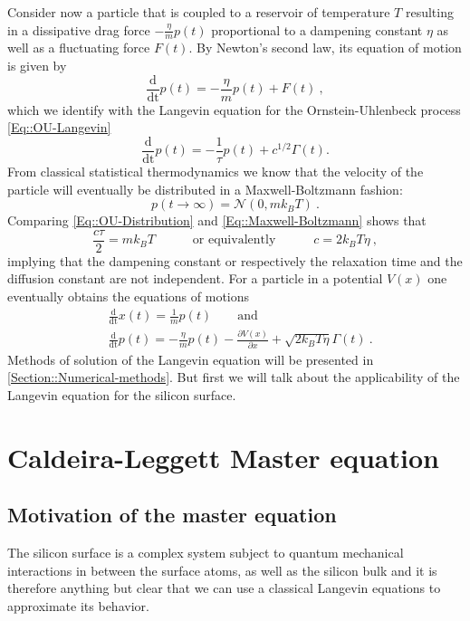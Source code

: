 	Consider now a particle that is coupled to a reservoir of temperature $T$ resulting in a dissipative drag force $- \frac{\eta}{m} p(t)$ proportional to a dampening constant $\eta$ as well as a fluctuating force $F(t)$. By Newton's second law, its equation of motion is given by
	\begin{equation}
		\frac{\text{d}}{\text{dt}} p(t) =	- \frac{\eta}{m} p(t) + F(t)~,
	\end{equation}
	which we identify with the Langevin equation for the Ornstein-Uhlenbeck process \autoref{Eq::OU-Langevin}
	\begin{equation}
		\frac{\text{d}}{\text{dt}} p(t) =	- \frac{1}{\tau} p(t) + { c^{1/2}}{} \Gamma(t).
	\end{equation}
	From classical statistical thermodynamics we know that the velocity of the particle will eventually be distributed in a Maxwell-Boltzmann fashion:
	\begin{equation} \label{Eq::Maxwell-Boltzmann}
		p(t\rightarrow \infty) =	\mathcal{N}(0, m k_B T)~.
	\end{equation}
	Comparing \autoref{Eq::OU-Distribution} and \autoref{Eq::Maxwell-Boltzmann} shows that
	\begin{equation}
		\frac{c \tau}{2} =	m k_B T \qquad \quad \text{or equivalently} \qquad \quad c =	{2 k_B T \eta }~,
	\end{equation}
	implying that the dampening constant or respectively the relaxation time and the diffusion constant are not independent. For a particle in a potential $V(x)$ one eventually obtains the equations of motions
	\begin{align} \label{Eq::Langevin-eq-motion-set-x}
		&\frac{\text{d}}{\text{dt}} x(t) =	\frac{1}{m} p(t) \qquad \text{and}\\
		\label{Eq::Langevin-eq-motion-set-p}
		&\frac{\text{d}}{\text{dt}} p(t) =	- \frac{\eta}{m} p(t) - \frac{\partial V(x)}{\partial x} + \sqrt{2 k_B T \eta } \Gamma(t) ~.
	\end{align}
	Methods of solution of the Langevin equation will be presented in \autoref{Section::Numerical-methods}. But first we will talk about the applicability of the Langevin equation for the silicon surface.
	\section{Caldeira-Leggett Master equation}
	\subsection{Motivation of the master equation}
	The silicon surface is a complex system subject to quantum mechanical interactions in between the surface atoms, as well as the silicon bulk and it is therefore anything but clear that we can use a classical Langevin equations to approximate its behavior.\\
	
